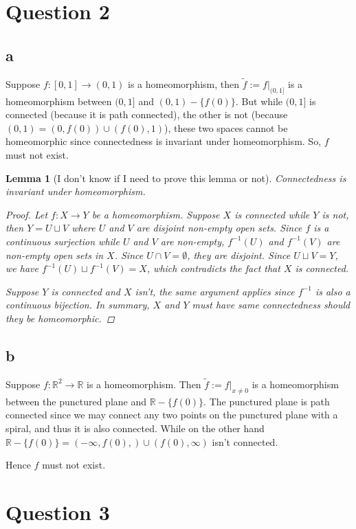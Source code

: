 \documentclass{article}
\newtheorem{lemma}{Lemma}
\begin{document}
\section*{Question 2}
\subsection*{a}
Suppose $f:[0,1]\to (0,1)$ is a homeomorphism, then $\tilde{f}:=f|_{(0,1]}$ is a homeomorphism between $(0,1]$ and $(0,1)-\{f(0) \}$. But while $ (0,1]$ is connected (because it is path connected), the other is not (because $(0,1)=(0,f(0))\cup (f(0),1)$), these two spaces cannot be homeomorphic since connectedness is invariant under homeomorphism. So, $f$ must not exist.

\begin{lemma}[I don't know if I need to prove this lemma or not]
Connectedness is invariant under homeomorphism.
\begin{proof}
		Let $f:X\to Y$ be a homeomorphism. Suppose $X$ is connected while $Y$ is not, then $Y=U\sqcup V$ where $U$ and $V$ are disjoint non-empty open sets. Since $f$ is a continuous surjection while $U$ and $V$ are non-empty, $f^{-1}(U)$ and $f^{-1}(V)$ are non-empty open sets in $X$. Since $U\cap V=\emptyset$, they are disjoint. Since $U\sqcup V=Y$, we have $f^{-1}(U)\sqcup f^{-1}(V)=X$, which contradicts the fact that $X$ is connected. 
		
		Suppose $Y$ is connected and $X$ isn't, the same argument applies since $f^{-1}$ is also a continuous bijection. In summary, $X$ and $Y$ must have same connectedness should they be homeomorphic.
\end{proof}
\end{lemma}


\subsection*{b}
Suppose $f:\mathbb{R}^2\to \mathbb{R}$ is a homeomorphism. Then $\tilde{f}:=f|_{x\neq 0}$ is a homeomorphism between the punctured plane and $\mathbb{R}-\{f(0)\}$. The punctured plane is path connected since we may connect any two points on the punctured plane with a spiral, and thus it is also connected. While on the other hand $\mathbb{R}-\{f(0)\}=(-\infty,f(0),)\cup (f(0),\infty)$ isn't connected.

 Hence $f$ must not exist.




\section*{Question 3}
\end{document}
